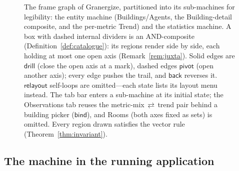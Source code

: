 \documentclass[11pt,a4paper]{article}
\theoremstyle{remark}
\newcommand{\vbind}{\mathsf{bind}}
\newcommand{\vdrill}{\mathsf{drill}}
\newcommand{\vpivot}{\mathsf{pivot}}
\newcommand{\vrelayout}{\mathsf{relayout}}
\newcommand{\vback}{\mathsf{back}}
\begin{document}
\begin{figure}[t]
\caption{The frame graph of Granergize, partitioned into its sub-machines for
legibility: the entity machine (Buildings/Agents, the Building-detail composite,
and the per-metric Trend) and the statistics machine. A box with dashed internal
dividers is an AND-composite (Definition~\ref{def:catalogue}): its regions render
side by side, each holding at most one open axis (Remark~\ref{rem:juxta}). Solid
edges are $\vdrill$ (close the open axis at a mark), dashed edges $\vpivot$ (open
another axis); every edge pushes the trail, and $\vback$ reverses it.
$\vrelayout$ self-loops are omitted---each state lists its layout menu instead.
The tab bar enters a sub-machine at its initial state; the \textsf{Observations}
tab reuses the metric-mix\,$\rightleftarrows$\,trend pair behind a building
picker ($\vbind$), and \textsf{Rooms} (both axes fixed as sets) is omitted.
Every region drawn satisfies the vector rule (Theorem~\ref{thm:invariant}).}
\label{fig:framegraph}
\end{figure}

\subsection{The machine in the running application}
\end{document}
